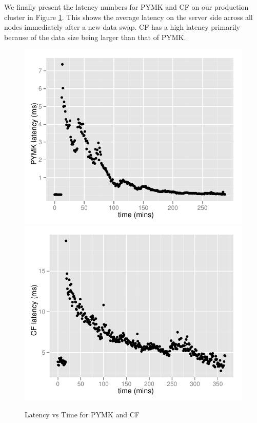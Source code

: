 We finally present the latency numbers for PYMK and CF on our
production cluster in Figure \ref{production}. This shows the average
latency on the server side across all nodes immediately after a new
data swap. CF has a high latency primarily because of the data size
being larger than that of PYMK.

\begin{figure}
  \centering
    \includegraphics[scale=0.55]{images/pymk_search.pdf}
    \includegraphics[scale=0.55]{images/browsemap_search.pdf}
  \caption{Latency vs Time for PYMK and CF}
  \label{production}
\end{figure}

